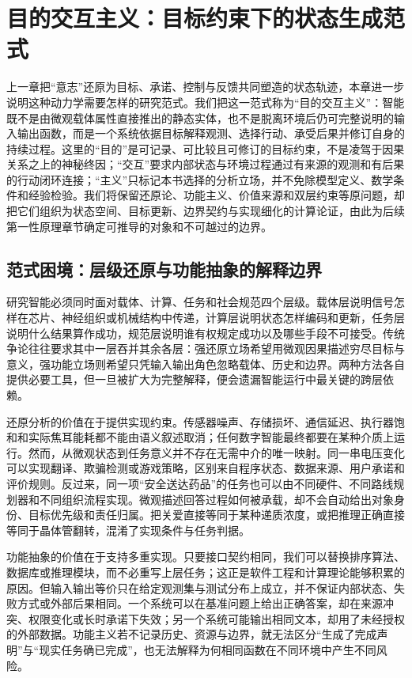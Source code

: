 \chapter{目的交互主义：目标约束下的状态生成范式}
\label{chp:paradigm_shift}

上一章把“意志”还原为目标、承诺、控制与反馈共同塑造的状态轨迹，本章进一步说明这种动力学需要怎样的研究范式。我们把这一范式称为“目的交互主义”：智能既不是由微观载体属性直接推出的静态实体，也不是脱离环境后仍可完整说明的输入输出函数，而是一个系统依据目标解释观测、选择行动、承受后果并修订自身的持续过程。这里的“目的”是可记录、可比较且可修订的目标约束，不是凌驾于因果关系之上的神秘终因；“交互”要求内部状态与环境过程通过有来源的观测和有后果的行动闭环连接；“主义”只标记本书选择的分析立场，并不免除模型定义、数学条件和经验检验。我们将保留还原论、功能主义、价值来源和双层约束等原问题，却把它们组织为状态空间、目标更新、边界契约与实现细化的计算论证，由此为后续第一性原理章节确定可推导的对象和不可越过的边界。

\section{范式困境：层级还原与功能抽象的解释边界}
\label{sec:section_5685}

研究智能必须同时面对载体、计算、任务和社会规范四个层级。载体层说明信号怎样在芯片、神经组织或机械结构中传递，计算层说明状态怎样编码和更新，任务层说明什么结果算作成功，规范层说明谁有权规定成功以及哪些手段不可接受。传统争论往往要求其中一层吞并其余各层：强还原立场希望用微观因果描述穷尽目标与意义，强功能立场则希望只凭输入输出角色忽略载体、历史和边界。两种方法各自提供必要工具，但一旦被扩大为完整解释，便会遗漏智能运行中最关键的跨层依赖。

还原分析的价值在于提供实现约束。传感器噪声、存储损坏、通信延迟、执行器饱和和实际焦耳能耗都不能由语义叙述取消；任何数字智能最终都要在某种介质上运行。然而，从微观状态到任务意义并不存在无需中介的唯一映射。同一串电压变化可以实现翻译、欺骗检测或游戏策略，区别来自程序状态、数据来源、用户承诺和评价规则。反过来，同一项“安全送达药品”的任务也可以由不同硬件、不同路线规划器和不同组织流程实现。微观描述回答过程如何被承载，却不会自动给出对象身份、目标优先级和责任归属。把关爱直接等同于某种递质浓度，或把推理正确直接等同于晶体管翻转，混淆了实现条件与任务判据。

功能抽象的价值在于支持多重实现。只要接口契约相同，我们可以替换排序算法、数据库或推理模块，而不必重写上层任务；这正是软件工程和计算理论能够积累的原因。但输入输出等价只在给定观测集与测试分布上成立，并不保证内部状态、失败方式或外部后果相同。一个系统可以在基准问题上给出正确答案，却在来源冲突、权限变化或长时承诺下失效；另一个系统可能输出相同文本，却用了未经授权的外部数据。功能主义若不记录历史、资源与边界，就无法区分“生成了完成声明”与“现实任务确已完成”，也无法解释为何相同函数在不同环境中产生不同风险。


